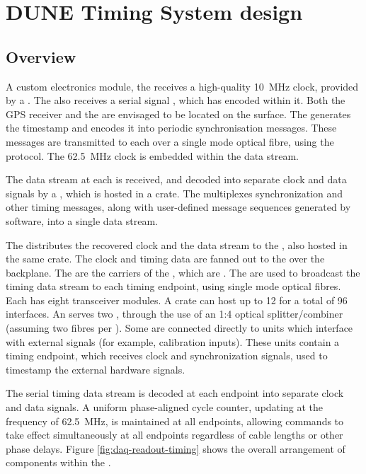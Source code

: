 \documentclass[main.tex]{subfiles}
\begin{document}
\section{DUNE Timing System design}
\label{sec:system_design}
\subsection{Overview}
A custom electronics module, the  receives a high-quality \SI{10}{\MHz} clock, provided by a . The  also receives a serial  signal \cite{irig}, which has  encoded within it. Both the GPS receiver and the  are envisaged to be located on the surface. The  generates the  timestamp and encodes it into periodic synchronisation messages. These messages are transmitted to each  over a single mode optical fibre, using the  protocol. The \SI{62.5}{\MHz} clock is embedded within the data stream.

The data stream at each  is received, and decoded into separate clock and data signals by a , which is hosted in a  crate. The  multiplexes synchronization and other timing messages, along with user-defined message sequences generated by software, into a single data stream. 

The  distributes the recovered clock and the data stream to the , also hosted in the same  crate. The clock and timing data are fanned out to the  over the  backplane. The  are the carriers of the , which are . The  are used to broadcast the timing data stream to each timing endpoint, using single mode optical fibres. Each  has eight  transceiver modules. A  crate can host up to 12  for a total of 96  interfaces. An  serves two , through the use of an 1:4 optical splitter/combiner (assuming two fibres per ). Some  are connected directly to units which interface with external signals (for example, calibration inputs). These  units contain a timing endpoint, which receives clock and synchronization signals, used to timestamp the external hardware signals.

The serial timing data stream is decoded at each endpoint into separate clock and data signals. A uniform phase-aligned cycle counter, updating at the  frequency of \SI{62.5}{\MHz}, is maintained at all endpoints, allowing commands to take effect simultaneously at all endpoints regardless of cable lengths or other phase delays. Figure \ref{fig:daq-readout-timing} shows the overall arrangement of components within the .
\end{document}
